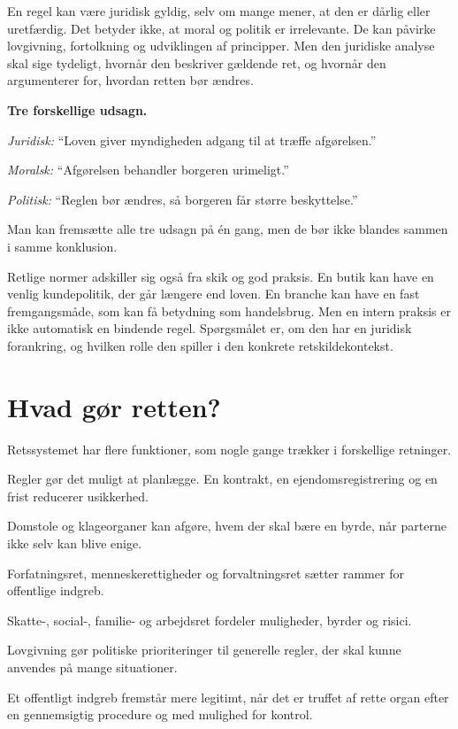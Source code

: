 En regel kan være juridisk gyldig, selv om mange mener, at den er dårlig eller uretfærdig. Det betyder ikke, at moral og politik er irrelevante. De kan påvirke lovgivning, fortolkning og udviklingen af principper. Men den juridiske analyse skal sige tydeligt, hvornår den beskriver gældende ret, og hvornår den argumenterer for, hvordan retten bør ændres.

\begin{examplebox}
\textbf{Tre forskellige udsagn.}

\emph{Juridisk:} ``Loven giver myndigheden adgang til at træffe afgørelsen.''

\emph{Moralsk:} ``Afgørelsen behandler borgeren urimeligt.''

\emph{Politisk:} ``Reglen bør ændres, så borgeren får større beskyttelse.''

Man kan fremsætte alle tre udsagn på én gang, men de bør ikke blandes sammen i samme konklusion.
\end{examplebox}

Retlige normer adskiller sig også fra skik og god praksis. En butik kan have en venlig kundepolitik, der går længere end loven. En branche kan have en fast fremgangsmåde, som kan få betydning som handelsbrug. Men en intern praksis er ikke automatisk en bindende regel. Spørgsmålet er, om den har en juridisk forankring, og hvilken rolle den spiller i den konkrete retskildekontekst.

\section{Hvad gør retten?}

Retssystemet har flere funktioner, som nogle gange trækker i forskellige retninger.

\begin{description}[style=nextline,leftmargin=0pt,labelindent=0pt]
  \item[Koordinering] Regler gør det muligt at planlægge. En kontrakt, en ejendomsregistrering og en frist reducerer usikkerhed.
  \item[Konfliktløsning] Domstole og klageorganer kan afgøre, hvem der skal bære en byrde, når parterne ikke selv kan blive enige.
  \item[Begrænsning af magt] Forfatningsret, menneskerettigheder og forvaltningsret sætter rammer for offentlige indgreb.
  \item[Fordeling] Skatte-, social-, familie- og arbejdsret fordeler muligheder, byrder og risici.
  \item[Udtryk for fælles beslutninger] Lovgivning gør politiske prioriteringer til generelle regler, der skal kunne anvendes på mange situationer.
  \item[Legitimering] Et offentligt indgreb fremstår mere legitimt, når det er truffet af rette organ efter en gennemsigtig procedure og med mulighed for kontrol.
\end{description}

